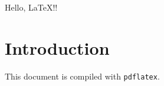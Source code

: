 \documentclass{article}
\begin{document}
    Hello, LaTeX!!

    \section{Introduction}
    This document is compiled with \texttt{pdflatex}.
\end{document}
